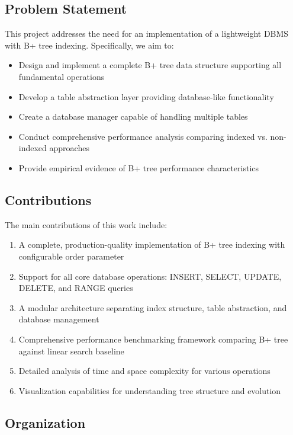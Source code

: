 \documentclass[conference]{IEEEtran}
\begin{document}
\subsection{Problem Statement}

This project addresses the need for an implementation of a lightweight DBMS with B+ tree indexing. Specifically, we aim to:

\begin{itemize}
    \item Design and implement a complete B+ tree data structure supporting all fundamental operations
    \item Develop a table abstraction layer providing database-like functionality
    \item Create a database manager capable of handling multiple tables
    \item Conduct comprehensive performance analysis comparing indexed vs. non-indexed approaches
    \item Provide empirical evidence of B+ tree performance characteristics
\end{itemize}

\subsection{Contributions}

The main contributions of this work include:

\begin{enumerate}
    \item A complete, production-quality implementation of B+ tree indexing with configurable order parameter
    \item Support for all core database operations: INSERT, SELECT, UPDATE, DELETE, and RANGE queries
    \item A modular architecture separating index structure, table abstraction, and database management
    \item Comprehensive performance benchmarking framework comparing B+ tree against linear search baseline
    \item Detailed analysis of time and space complexity for various operations
    \item Visualization capabilities for understanding tree structure and evolution
\end{enumerate}

\subsection{Organization}
\end{document}
